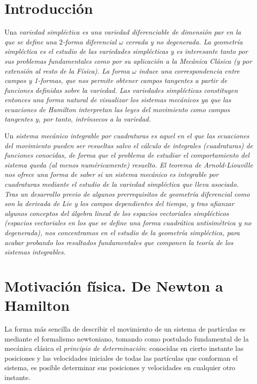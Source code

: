 \section*{Introducción}
Una \em variedad simpléctica \em es una variedad diferenciable de dimensión par en la que se define una $2$-forma diferencial $\omega$ cerrada y no degenerada. La \em geometría simpléctica \em es el estudio de las variedades simplécticas y es interesante tanto por sus problemas fundamentales como por su aplicación a la Mecánica Clásica (y por extensión al resto de la Física). La forma $\omega$ induce una correspondencia entre campos y 1-formas, que nos permite obtener campos tangentes a partir de funciones definidas sobre la variedad. Las variedades simplécticas constituyen entonces una forma natural de visualizar los sistemas mecánicos ya que las \em ecuaciones de Hamilton \em interpretan las leyes del movimiento como campos tangentes y, por tanto, intrínsecos a la variedad. 

Un \em sistema mecánico integrable por cuadraturas \em  es aquel en el que las ecuaciones del movimiento pueden ser resueltas salvo el cálculo de integrales (cuadraturas) de funciones conocidas, de forma que el problema de estudiar el comportamiento del sistema queda (al menos numéricamente) resuelto. El \em teorema de Arnold-Liouville \em nos ofrece una forma de saber si un sistema mecánico es integrable por cuadraturas mediante el estudio de la variedad simpléctica que lleva asociado.
Tras un desarrollo previo de algunos prerrequisitos de geometría diferencial como son la \em derivada de Lie \em y los \em campos dependientes del tiempo\em, y tras afianzar algunos conceptos del álgebra lineal de los \em espacios vectoriales simplécticos \em (espacios vectoriales en los que se define una forma cuadrática antisimétrica y no degenerada), nos concentramos en el estudio de la geometría simpléctica, para acabar probando los resultados fundamentales que componen la teoría de los sistemas integrables.



\section{Motivación física. De Newton a Hamilton} \label{sec:fisica}
La forma más sencilla de describir el movimiento de un sistema de partículas es mediante el formalismo newtoniano, tomando como postulado fundamental de la mecánica clásica el \emph{principio de determinación}: conocidas en cierto instante las posiciones y las velocidades iniciales de todas las partículas que conforman el sistema, es posible determinar sus posiciones y velocidades en cualquier otro instante.

